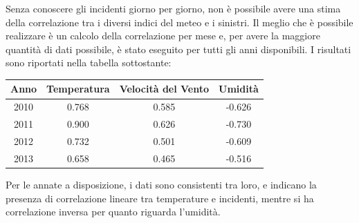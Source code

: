 \documentclass[a4paper]{report}
\begin{document}
Senza conoscere gli incidenti giorno per giorno, non è possibile avere una stima della 
correlazione tra i diversi indici del meteo e i sinistri.
Il meglio che è possibile realizzare è un calcolo della correlazione per mese e, per 
avere la maggiore quantità di dati possibile, è stato eseguito per tutti gli 
anni disponibili.
I risultati sono riportati nella tabella sottostante: 

\begin{center}
    \def\arraystretch{1.5}%
    \begin{tabular}{ |c|c|c|c| } 
    \hline
    Anno & Temperatura & Velocità del Vento & Umidità \\ 
    \hline
    \rowcolor{TableGray}
    2010 & 0.768 & 0.585 & -0.626 \\
    2011 & 0.900 & 0.626 & -0.730 \\
    \rowcolor{TableGray}
    2012 & 0.732 & 0.501 & -0.609 \\
    2013 & 0.658 & 0.465 & -0.516 \\
    \hline
    \end{tabular}
\end{center}

Per le annate a disposizione, i dati sono consistenti tra loro, e indicano la presenza di 
correlazione lineare tra temperature e incidenti, mentre si ha correlazione inversa per quanto 
riguarda l'umidità.




\end{document}
